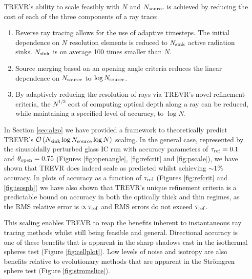 \documentclass[fleq,usenatbib]{mnras}
\newcommand{\acro}{TREVR}
\newcommand{\bigO}[1]{\mathcal{O}\left(#1\right)}
\newcommand{\NS}{N_{\rm source}}
\newcommand{\NK}{N_{\rm sink}}
\newcommand{\tr}{\tau_{\rm ref}}
\newcommand{\tO}{\theta_{\rm open}}
\newcommand{\strom}{Str\"omgren}
\begin{document}
\acro{}'s ability to scale feasibly with $N$ and $\NS$ is achieved by reducing 
the cost of each of the three components of a ray trace:
\begin{enumerate}
\item Reverse ray tracing allows for the use of adaptive timesteps. The 
initial dependence on $N$ resolution elements is reduced to $\NK$ active 
radiation sinks. $\NK$ is on average 100 times smaller than $N$.
\item Source merging based on an opening angle criteria reduces the linear 
dependence on $\NS$ to $\log\NS$.
\item By adaptively reducing the resolution of rays via \acro{}'s novel 
refinement criteria, the $N^{1/3}$ cost of computing optical depth along a ray
can be reduced, while maintaining a specified level of accuracy, to $\log N$.
\end{enumerate}
In Section \ref{sec:algo} we have provided a framework to theoretically 
predict \acro{}'s $\bigO{\NK \log\NS \log N}$ scaling. In the general case, 
represented by the sinusoidally perturbed glass IC run with accuracy 
parameters of $\tr=0.1$ and $\tO=0.75$ (Figures \ref{fig:openangle}, 
\ref{fig:refcrit} and \ref{fig:pscale}), we have shown that \acro{} does 
indeed scale as predicted whilst achieving $\sim 1\%$ accuracy. In plots of 
accuracy as a function of $\tr$ (Figures \ref{fig:refcrit} and 
\ref{fig:isosph}) we have also shown that \acro{}'s unique refinement criteria 
is a predictable bound on accuracy in both the optically thick and thin 
regimes, as the RMS relative error is $\propto \tr$ and RMS errors do not 
exceed $\tr$.

This scaling enables \acro{} to reap the benefits inherent to instantaneous 
ray tracing methods whilst still being feasible and general. Directional 
accuracy is one of these benefits that is apparent in the sharp shadows cast 
in the isothermal spheres test (Figure \ref{fig:cellplot}). Low levels of 
noise and isotropy are also benefits relative to evolutionary methods that are 
apparent in the \strom{} sphere test (Figure \ref{fig:stromslice}).
\end{document}
